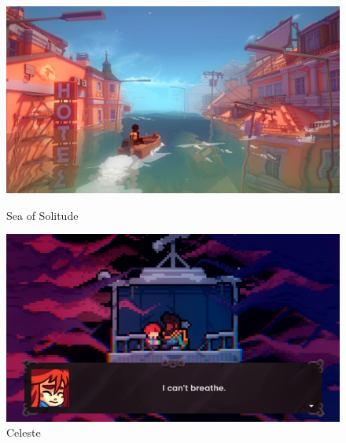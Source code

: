 \begin{figure}
    \centering
    \begin{minipage}{.49\textwidth}
        \includegraphics[width=\textwidth]{imgs/sea-of-solitude.png}
        \caption{Sea of Solitude}
        \label{fig:sea-solitude}
    \end{minipage}
    \begin{minipage}{.49\textwidth}
        \includegraphics[width=\textwidth]{imgs/celeste_panic_attack.png}
        \caption{Celeste}
        \label{fig:celeste}
    \end{minipage}
\end{figure}
